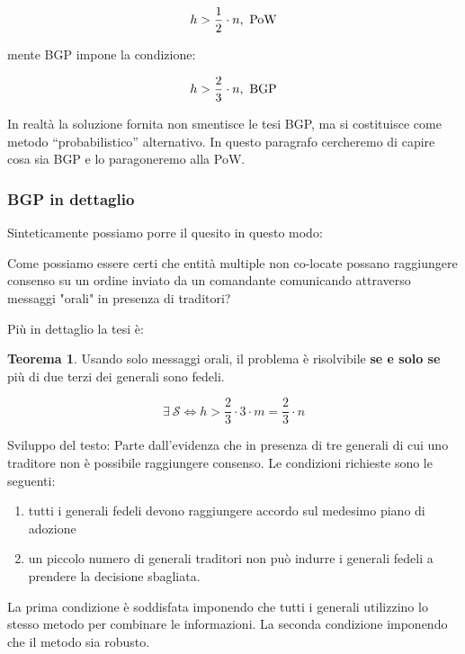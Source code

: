 \documentclass{book}
\theoremstyle{definition}
\newtheorem{teorema}{Teorema}
\begin{document}
\[
    h > \frac{1}{2} \cdot n, \ \textnormal{PoW}
\]

mente BGP impone la condizione:

\[
    h > \frac{2}{3} \cdot n, \ \textnormal{BGP}
\]

In realtà la soluzione fornita non smentisce le tesi BGP, ma si costituisce come metodo ``probabilistico'' alternativo.
In questo paragrafo cercheremo di capire cosa sia BGP e lo paragoneremo alla PoW.

\subsubsection{BGP in dettaglio}

Sinteticamente possiamo porre il quesito  in questo modo:

\begin{displayquote}
    Come possiamo essere certi che entità multiple non co-locate 
    possano raggiungere consenso su un ordine inviato da un comandante
    comunicando attraverso messaggi "orali"
    in presenza di traditori?
\end{displayquote}

Più in dettaglio la tesi è:

\begin{teorema}
    Usando solo messaggi orali, il problema è risolvibile \textbf{se e solo se} più di due terzi dei generali sono fedeli.

    \[
        \exists \ \mathcal{S} \iff h > \frac{2}{3} \cdot 3 \cdot m = \frac{2}{3} \cdot n
    \]
\end{teorema}

Sviluppo del testo:
Parte dall'evidenza che in presenza di tre generali di cui uno traditore non è possibile raggiungere consenso.
Le condizioni richieste sono le seguenti:

\begin{enumerate}[label=(\Alph*),itemindent=*]
    \item tutti i generali fedeli devono raggiungere accordo sul medesimo piano di adozione
    \item un piccolo numero di generali traditori non può indurre i generali fedeli a prendere la decisione sbagliata.
\end{enumerate}

La prima condizione è soddisfata imponendo che tutti i generali utilizzino lo stesso metodo per combinare le informazioni.
La seconda condizione imponendo che il metodo sia robusto.
\end{document}

